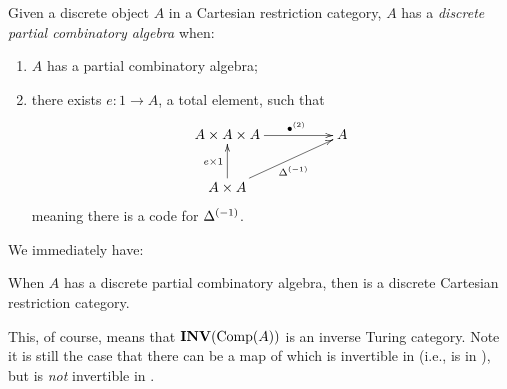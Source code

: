 \begin{definition}\label{def:discrete_pca}
  Given a discrete object $A$ in a Cartesian restriction category, $A$ has a \emph{discrete partial
    combinatory algebra} when:
  \begin{enumerate}[{(}i{)}]
  \item $A$ has a partial combinatory algebra;
  \item there exists $e:1\to A$, a total element, such that
    \[
      \xymatrix@C+25pt{
        A\times A \times A\ar[r]^(.6){\multibullet{2}} & A \\
        A\times A  \ar[u]^{e\times 1} \ar[ur]_{\inv{\Delta}}
      }
    \]
    meaning there is a code for ${\Delta}^{(-1)}$.
  \end{enumerate}
\end{definition}

We immediately have:
\begin{lemma}\label{lem:comp_a_is_discrete_cart}
  When $A$ has a discrete partial combinatory algebra, then \compa is a discrete Cartesian
  restriction category.
\end{lemma}
This, of course, means that $\mathbf{INV}({\text{Comp}(A)})$ is an inverse Turing category. Note it is still the case
that there can be a map of \compa which is invertible in \Xt (i.e., is in \X), but is \emph{not}
invertible in \compa.


